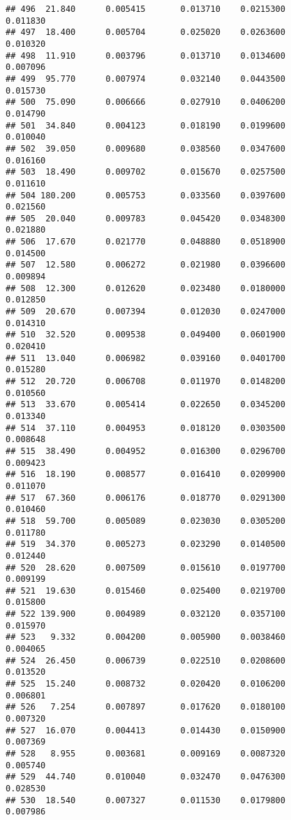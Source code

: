 \documentclass[
]{article}
\begin{document}
\begin{verbatim}
## 496  21.840      0.005415       0.013710    0.0215300          0.011830
## 497  18.400      0.005704       0.025020    0.0263600          0.010320
## 498  11.910      0.003796       0.013710    0.0134600          0.007096
## 499  95.770      0.007974       0.032140    0.0443500          0.015730
## 500  75.090      0.006666       0.027910    0.0406200          0.014790
## 501  34.840      0.004123       0.018190    0.0199600          0.010040
## 502  39.050      0.009680       0.038560    0.0347600          0.016160
## 503  18.490      0.009702       0.015670    0.0257500          0.011610
## 504 180.200      0.005753       0.033560    0.0397600          0.021560
## 505  20.040      0.009783       0.045420    0.0348300          0.021880
## 506  17.670      0.021770       0.048880    0.0518900          0.014500
## 507  12.580      0.006272       0.021980    0.0396600          0.009894
## 508  12.300      0.012620       0.023480    0.0180000          0.012850
## 509  20.670      0.007394       0.012030    0.0247000          0.014310
## 510  32.520      0.009538       0.049400    0.0601900          0.020410
## 511  13.040      0.006982       0.039160    0.0401700          0.015280
## 512  20.720      0.006708       0.011970    0.0148200          0.010560
## 513  33.670      0.005414       0.022650    0.0345200          0.013340
## 514  37.110      0.004953       0.018120    0.0303500          0.008648
## 515  38.490      0.004952       0.016300    0.0296700          0.009423
## 516  18.190      0.008577       0.016410    0.0209900          0.011070
## 517  67.360      0.006176       0.018770    0.0291300          0.010460
## 518  59.700      0.005089       0.023030    0.0305200          0.011780
## 519  34.370      0.005273       0.023290    0.0140500          0.012440
## 520  28.620      0.007509       0.015610    0.0197700          0.009199
## 521  19.630      0.015460       0.025400    0.0219700          0.015800
## 522 139.900      0.004989       0.032120    0.0357100          0.015970
## 523   9.332      0.004200       0.005900    0.0038460          0.004065
## 524  26.450      0.006739       0.022510    0.0208600          0.013520
## 525  15.240      0.008732       0.020420    0.0106200          0.006801
## 526   7.254      0.007897       0.017620    0.0180100          0.007320
## 527  16.070      0.004413       0.014430    0.0150900          0.007369
## 528   8.955      0.003681       0.009169    0.0087320          0.005740
## 529  44.740      0.010040       0.032470    0.0476300          0.028530
## 530  18.540      0.007327       0.011530    0.0179800          0.007986

\end{verbatim}
\end{document}
